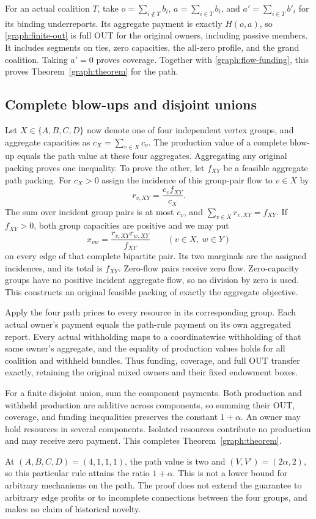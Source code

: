 For an actual coalition $T$, take $o=\sum_{i\notin T}b_i$,
$a=\sum_{i\in T}b_i$, and $a'=\sum_{i\in T}b'_i$ for its binding
underreports. Its aggregate payment is exactly $H(o,a)$, so
\eqref{graph:finite-out} is full OUT for the original owners, including
passive members. It includes segments on ties, zero capacities, the
all-zero profile, and the grand coalition. Taking $a'=0$ proves coverage.
Together with \eqref{graph:flow-funding}, this proves
Theorem~\ref{graph:theorem} for the path.

\subsection{Complete blow-ups and disjoint unions}

Let $X\in\{A,B,C,D\}$ now denote one of four independent vertex groups,
and aggregate capacities as $c_X=\sum_{v\in X}c_v$. The production value
of a complete blow-up equals the path value at these four aggregates.
Aggregating any original packing proves one inequality. To prove the
other, let $f_{XY}$ be a feasible aggregate path packing. For $c_X>0$ assign
the incidence of this group-pair flow to $v\in X$ by
\[
 r_{v,XY}=\frac{c_v f_{XY}}{c_X}.
\]
The sum over incident group pairs is at most $c_v$, and
$\sum_{v\in X}r_{v,XY}=f_{XY}$. If $f_{XY}>0$, both group capacities
are positive and we may put
\[
 x_{vw}=\frac{r_{v,XY}r_{w,XY}}{f_{XY}}
 \qquad(v\in X,\ w\in Y)
\]
on every edge of that complete bipartite pair. Its two marginals are the
assigned incidences, and its total is $f_{XY}$. Zero-flow pairs receive
zero flow. Zero-capacity groups have no positive incident aggregate flow,
so no division by zero is used. This constructs an original feasible
packing of exactly the aggregate objective.

Apply the four path prices to every resource in its corresponding group.
Each actual owner's payment equals the path-rule payment on its own
aggregated report. Every actual withholding maps to a coordinatewise
withholding of that same owner's aggregate, and the equality of production
values holds for all coalition and withheld bundles. Thus funding,
coverage, and full OUT transfer exactly, retaining the original mixed
owners and their fixed endowment boxes.

For a finite disjoint union, sum the component payments. Both production
and withheld production are additive across components, so summing their
OUT, coverage, and funding inequalities preserves the constant $1+\alpha$.
An owner may hold resources in several components. Isolated resources
contribute no production and may receive zero payment. This completes
Theorem~\ref{graph:theorem}.

\begin{remark}\label{graph:scope}
At $(A,B,C,D)=(4,1,1,1)$, the path value is two and
$(V,V')=(2\alpha,2)$, so this particular rule attains the ratio
$1+\alpha$. This is not a lower bound for arbitrary mechanisms on the
path. The proof does not extend the guarantee to arbitrary edge profits
or to incomplete connections between the four groups, and makes no
claim of historical novelty.
\end{remark}
